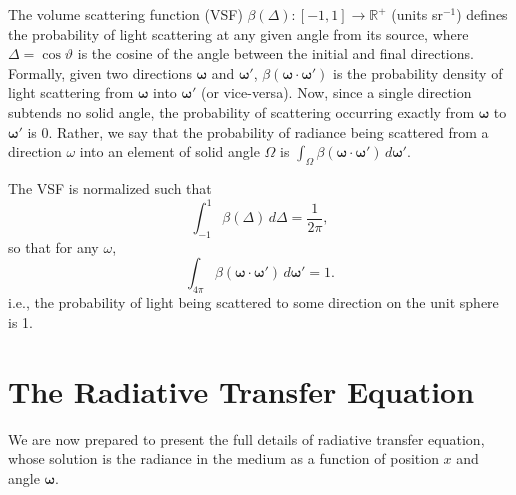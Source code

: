 \documentclass[ms,cpyr,lof,lot]{uathesis}
\newcommand\RR{\mathbb{R}}
\renewcommand\vec\bm
\begin{document}
The volume scattering function (VSF) $\beta(\Delta): [-1, 1] \to \RR^+$ (units sr$^{-1}$) defines the probability of light scattering at any given angle from its source, where $\Delta=\cos\vartheta$ is the cosine of the angle between the initial and final directions.
Formally, given two directions $\vec{\omega}$ and $\vec{\omega}'$, $\beta(\vec{\omega} \cdot \vec{\omega}')$ is the probability density of light scattering from $\vec{\omega}$ into $\vec{\omega}'$ (or vice-versa).
Now, since a single direction subtends no solid angle, the probability of scattering occurring exactly from $\vec{\omega}$ to $\vec{\omega}'$ is 0.
Rather, we say that the probability of radiance being scattered from a direction $\omega$ into an element of solid angle $\Omega$ is $\int_\Omega \beta(\vec{\omega} \cdot \vec{\omega}')\, d\vec{\omega}'$.

The VSF is normalized such that
\begin{equation*}
  \int_{-1}^1\beta(\Delta)\, d\Delta=\frac{1}{2\pi},
\end{equation*}
so that for any $\omega$,
\begin{equation*}
  \int_{4\pi}\beta(\vec{\omega}\cdot\vec{\omega}')\, d\vec{\omega}' = 1.
\end{equation*}
i.e., the probability of light being scattered to some direction on the unit sphere is 1.

\section{The Radiative Transfer Equation}
We are now prepared to present the full details of radiative transfer equation, whose solution is the radiance in the medium as a function of position $x$ and angle $\vec{\omega}$.
\end{document}
